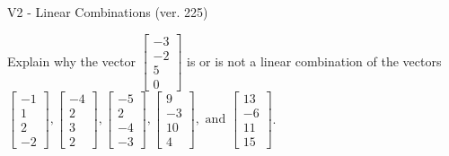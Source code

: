 \begin{exercise}
  \begin{exerciseTitle}V2 - Linear Combinations (ver. 225)\end{exerciseTitle}
  \begin{exerciseStatement}
    Explain why the vector \(\left[\begin{array}{c}
-3 \\
-2 \\
5 \\
0
\end{array}\right]\)  is or is not a linear 
	combination of the vectors \(\left[\begin{array}{c}
-1 \\
1 \\
2 \\
-2
\end{array}\right] , \left[\begin{array}{c}
-4 \\
2 \\
3 \\
2
\end{array}\right] , \left[\begin{array}{c}
-5 \\
2 \\
-4 \\
-3
\end{array}\right] , \left[\begin{array}{c}
9 \\
-3 \\
10 \\
4
\end{array}\right] , \text{ and } \left[\begin{array}{c}
13 \\
-6 \\
11 \\
15
\end{array}\right]\).
	



\end{exerciseStatement}
\end{exercise}
